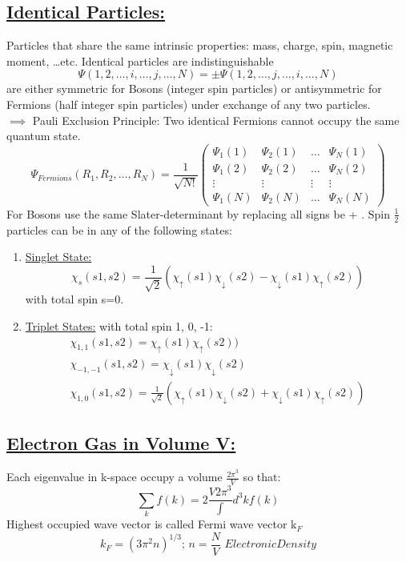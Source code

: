 \documentclass[a4paper,12pt]{article}
\begin{document}
\subsection*{\underline{Identical Particles:}}
Particles that share the same intrinsic properties: mass, charge, spin, magnetic moment, \dots etc. Identical particles are indistinguishable
\begin{equation}
\Psi(1, 2, \dots, i, \dots, j, \dots, N)=\pm\Psi(1, 2, \dots, j, \dots, i, \dots, N)
\end{equation}
are either symmetric for Bosons (integer spin particles) or antisymmetric for Fermions (half integer spin particles) under exchange of any two particles.\\
$\implies$ Pauli Exclusion Principle: Two identical Fermions cannot occupy the same quantum state.
\begin{equation}
\Psi_{Fermions}(R_1,R_2,\dots,R_N)= \frac{1}{\sqrt{N!}}
\left(\begin{matrix}
\Psi_1(1)	&\Psi_2(1)		&\dots 	&\Psi_N(1)\\
\Psi_1(2)	&\Psi_2(2)		&\dots 	&\Psi_N(2)\\
\vdots 	&\vdots 		&\vdots 	&\vdots\\
\Psi_1(N)	&\Psi_2(N)		&\dots 	&\Psi_N(N)
\end{matrix}\right)
\end{equation}
For Bosons use the same Slater-determinant by replacing all signs be + .
Spin $\frac{1}{2}$ particles can be in any of the following states:
\begin{enumerate}
\item[] \underline{Singlet State:} \begin{equation} \chi_s(s1,s2)=\frac{1}{\sqrt{2}}(\chi_{\uparrow}(s1)\chi_{\downarrow}(s2)-\chi_{\downarrow}(s1)\chi_{\uparrow}(s2)) \end{equation} with total spin s=0.
\item[] \underline{Triplet States:} with total spin 1, 0, -1:
\begin{align}
&\chi_{1,1}(s1,s2)=\chi_{\uparrow}(s1)\chi_{\uparrow}(s2)) &\\
&\chi_{-1,-1}(s1,s2)=\chi_{\downarrow}(s1)\chi_{\downarrow}(s2) &\\
&\chi_{1,0}(s1,s2)=\frac{1}{\sqrt{2}}(\chi_{\uparrow}(s1)\chi_{\downarrow}(s2)+\chi_{\downarrow}(s1)\chi_{\uparrow}(s2))
\end{align}
\end{enumerate}
\subsection*{\underline{Electron Gas in Volume V:}}
Each eigenvalue in k-space occupy a volume $\frac{{2\pi}^3}{V}$ so that:
\begin{equation} \sum_k f(k)=2\frac{{V}{2\pi}^3}\int d^3k f(k) \end{equation}
Highest occupied wave vector is called Fermi wave vector k$_F$ 
\begin{equation} k_F = (3\pi^2n)^{1/3}; \, n=\frac{N}{V} \,\, Electronic Density\end{equation}
\end{document}
